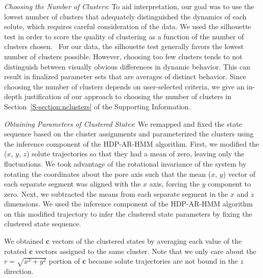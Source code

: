 \documentclass[journal=jpcbfk,manuscript=article]{achemso}
\begin{document}
  \textit{Choosing the Number of Clusters}: To aid interpretation, our goal was to
  use the lowest number of clusters that adequately distinguished the dynamics of 
  each solute, which requires careful consideration of the data. We used the silhouette
  test in order to score the quality of clustering as a function of the number of clusters
  chosen.~\cite{kaufman_finding_2009} For our data, the silhouette test generally favors 
  the lowest number of clusters possible. However, choosing too few clusters tends to not
  distinguish between visually obvious differences in dynamic behavior. This can result 
  in finalized parameter sets that are averages of distinct behavior. Since choosing 
  the number of clusters depends on user-selected criteria, we give an in-depth 
  justification of our approach to choosing the number of clusters in 
  Section~\ref{S-section:nclusters} of the Supporting Information.  
  
  \textit{Obtaining Parameters of Clustered States}: We remapped and fixed the
  state sequence based on the cluster assignments and 
  parameterized the clusters using the inference component of the HDP-AR-HMM algorithm.
  First, we modified the ($x$, $y$, $z$) solute trajectories so that they had a 
  mean of zero, leaving only the fluctuations. We took advantage of the
  rotational invariance of the system by rotating the coordinates about the pore 
  axis such that the mean ($x$, $y$) vector of each separate segment was aligned with the 
  $x$ axis, forcing the $y$ component to zero. Next, we subtracted the means from 
  each separate segment in the $x$ and $z$ dimensions. We used
  the inference component of the HDP-AR-HMM algorithm on this modified trajectory to 
  infer the clustered state parameters by fixing the clustered state sequence.
  
  We obtained $\mathbf{c}$ vectors of the clustered states by averaging each 
  value of the rotated $\mathbf{c}$ vectors assigned to the same cluster. Note
  that we only care about the $r=\sqrt{x^2+y^2}$ portion of $\mathbf{c}$ because
  solute trajectories are not bound in the $z$ direction.
  
\end{document}
